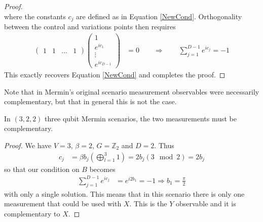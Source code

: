 \begin{proof}
\[\]
where the constants $c_j$ are defined as in Equation \ref{NewCond}.
Orthogonality between the control and variations points then requires
\begin{align*}
\left(\begin{array}{cccc}1 & 1 & ... & 1 \end{array}\right)
\left(\begin{array}{c}1 \\ e^{ic_1} \\\vdots \\ e^{ic_{D-1}} \end{array}\right) &= 0 \qquad \Rightarrow \qquad
\sum_{j=1}^{D-1}e^{ic_j} = -1
\end{align*}
This exactly recovers Equation \ref{NewCond} and completes the proof.
\end{proof} 

Note that in Mermin's original scenario  measurement observables were necessarily complementary, but that in general this is not the case.
\begin{theorem}
\label{thm:qubitcase}
In $(3,2,2)$ three qubit Mermin scenarios, the two measurements must be complementary.
\end{theorem}
\begin{proof}
We have $V=3$, $\beta = 2$, $G=\mathbb{Z}_2$ and $D = 2$. Thus
\begin{align*}
c_j &= \beta b_j \left(\bigoplus^3_{l=1}1\right)= 2b_j (3 \mod 2) = 2b_j
\end{align*}
so that our condition on $B$ becomes
\begin{align*}
\sum_{j=1}^{D-1}e^{ic_j} &= e^{i2b_1} = -1 \Rightarrow
b_1 = \frac{\pi}{2}
\end{align*}
with only a single solution.  This means that in this scenario there is only one measurement that could be used with $X$.  This is the $Y$ observable and it is complementary to $X$.
\end{proof}

